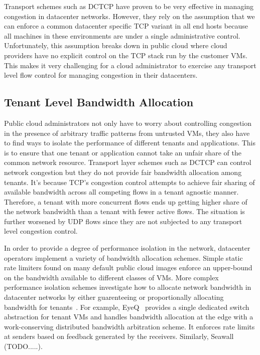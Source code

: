 Transport schemes such as DCTCP have proven to be very effective in managing congestion 
in datacenter networks. However, they rely on the assumption that we can enforce a common
datacenter specific TCP variant in all end hosts because all machines in these 
environments are under a single administrative control. Unfortunately, this assumption 
breaks down in public cloud where cloud providers have no explicit control on the TCP 
stack run by the customer VMs. This makes it very challenging for a cloud administrator 
to exercise any transport level flow control for managing congestion in their 
datacenters. 


\subsection{Tenant Level Bandwidth Allocation}
Public cloud administrators not only have to worry about controlling congestion in the 
presence of arbitrary traffic patterns from untrusted VMs, they also have to find ways to
isolate the performance of different tenants and applications. This is to ensure that one
tenant or application cannot take an unfair share of the common network resource. 
Transport layer schemes such as DCTCP can control network congestion but they do not 
provide fair bandwidth allocation among tenants. It's because TCP's congestion control 
attempts to achieve fair sharing of available bandwidth across all competing flows in a 
tenant agnostic manner. Therefore, a tenant with more concurrent flows ends up getting 
higher share of the network bandwidth than a tenant with fewer active flows. The 
situation is further worsened by UDP flows since they are not subjected to any transport 
level congestion control.

In order to provide a degree of performance isolation in the network, datacenter 
operators implement a variety of bandwidth allocation schemes. Simple static rate 
limiters found on many default public cloud images enforce an upper-bound on the 
bandwidth available to different classes of VMs. More complex performance isolation 
schemes investigate how to allocate network bandwidth in datacenter networks by either 
guarenteeing or proportionally allocating bandwidth for tenants~\cite{rodrigues2011gatekeeper,Ballani2011oktopus,jeyakumar2013eyeq,shieh2011sharing,Guo2010Secondnet,Popa2012Faircloud,Xie2012Proteus,Lam2012NetShare}. For example, EyeQ~\cite{jeyakumar2013eyeq} provides a
single dedicated switch abstraction for tenant VMs and handles bandwidth allocation at 
the edge with a work-conserving distributed bandwidth arbitration scheme. It enforces 
rate limits at senders based on feedback generated by the receivers. Similarly, Seawall 
(TODO.....).

